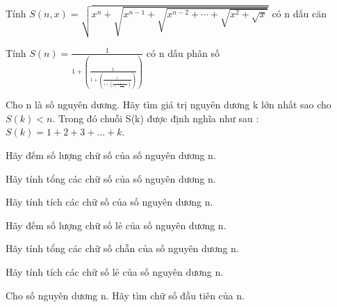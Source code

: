 \begin{problem}
    Tính $S(n,x) = \sqrt{x^n + \sqrt{x^{n - 1} + \sqrt{x^{n-2} + \cdots + \sqrt{x^2 + \sqrt{x}}}}}$ có n dấu căn
\end{problem}

\begin{problem}
    Tính $S(n) = \frac{1}{1 + (\frac{1}{1 +(\frac{1}{1 + (\frac{1}{1 + (\frac{1}{1 + 1})})})})}$ có n dấu phân số
\end{problem}

\begin{problem}
    Cho n là số nguyên dương. Hãy tìm giá trị nguyên dương k lớn nhất sao
cho $S(k) < n$. Trong đó chuỗi S(k) được định nghĩa như sau : $S(k) = 1 +
2 + 3 + … + k$.
\end{problem}

\begin{problem}
    Hãy đếm số lượng chữ số của số nguyên dương n.
\end{problem}

\begin{problem}
    Hãy tính tổng các chữ số của số nguyên dương n.
\end{problem}

\begin{problem}
    Hãy tính tích các chữ số của số nguyên dương n.
\end{problem}

\begin{problem}
    Hãy đếm số lượng chữ số lẻ của số nguyên dương n.
\end{problem}

\begin{problem}
    Hãy tính tổng các chữ số chẵn của số nguyên dương n.
\end{problem}

\begin{problem}
    Hãy tính tích các chữ số lẻ của số nguyên dương n.
\end{problem}

\begin{problem}
     Cho số nguyên dương n. Hãy tìm chữ số đầu tiên của n.
\end{problem}

